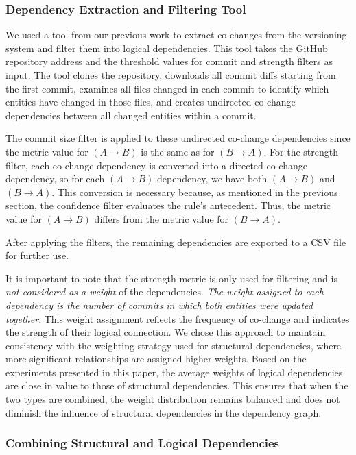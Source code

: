 \documentclass{ieeeaccess}
\begin{document}
\subsubsection{Dependency Extraction and Filtering Tool}

We used a tool from our previous work \cite{b4} to extract co-changes from the versioning system and filter them into logical dependencies. This tool takes the GitHub repository address and the threshold values for commit and strength filters as input. The tool clones the repository, downloads all commit diffs starting from the first commit, examines all files changed in each commit to identify which entities have changed in those files, and creates undirected co-change dependencies between all changed entities within a commit.

The commit size filter is applied to these undirected co-change dependencies since the metric value for $(A \rightarrow B)$ is the same as for $(B \rightarrow A)$. For the strength filter, each co-change dependency is converted into a directed co-change dependency, so for each $(A \rightarrow B)$ dependency, we have both $(A \rightarrow B)$ and $(B \rightarrow A)$. This conversion is necessary because, as mentioned in the previous section, the confidence filter evaluates the rule's antecedent. Thus, the metric value for $(A \rightarrow B)$ differs from the metric value for $(B \rightarrow A)$.

After applying the filters, the remaining dependencies are exported to a CSV file for further use.

It is important to note that the strength metric is only used for filtering and is \textit{not considered as a weight} of the dependencies. \textit{The weight assigned to each dependency is the number of commits in which both entities were updated together}. This weight assignment reflects the frequency of co-change and indicates the strength of their logical connection. We chose this approach to maintain consistency with the weighting strategy used for structural dependencies, where more significant relationships are assigned higher weights. Based on the experiments presented in this paper, the average weights of logical dependencies are close in value to those of structural dependencies. This ensures that when the two types are combined, the weight distribution remains balanced and does not diminish the influence of structural dependencies in the dependency graph.


\subsubsection{Combining Structural and Logical Dependencies}
\end{document}
